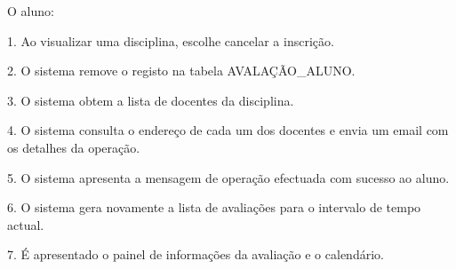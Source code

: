 O aluno:

1. Ao visualizar uma disciplina, escolhe cancelar a inscrição.

2. O sistema remove o registo na tabela AVALAÇÃO\_ALUNO.

3. O sistema obtem a lista de docentes da disciplina.

4. O sistema consulta o endereço de cada um dos docentes e envia um email com os detalhes da operação.

5. O sistema apresenta a mensagem de operação efectuada com sucesso ao aluno.

6. O sistema gera novamente a lista de avaliações para o intervalo de tempo actual.

7. É apresentado o painel de informações da avaliação e o calendário. 